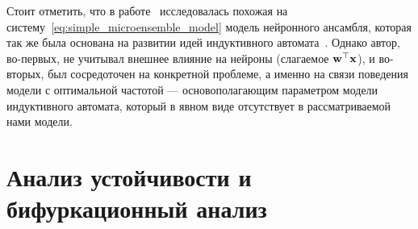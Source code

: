 
Стоит отметить, что в работе~\cite{Pchelkin2003} исследовалась похожая на систему~\eqref{eq:simple_microensemble_model} модель нейронного ансамбля, которая так же была основана на развитии идей индуктивного автомата~\cite{EmelyanovYaroslavsky1990}. Однако автор, во-первых, не учитывал внешнее влияние на нейроны (слагаемое $\mathrm{\mathbf{w}}^{\top} \mathrm{\mathbf{x}}$), и во-вторых, был сосредоточен на конкретной проблеме, а именно на связи поведения модели с \socalled оптимальной частотой --- основополагающим параметром модели индуктивного автомата, который в явном виде отсутствует в рассматриваемой нами модели.


\section{Анализ устойчивости и бифуркационный анализ} \label{section:neuron_equilibrium}

